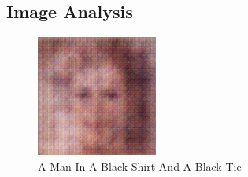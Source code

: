 \documentclass{article}%
\begin{document}
%
\subsection{Image Analysis}%
\label{subsec:ImageAnalysis}%


\begin{figure}[h!]%
\centering%
\includegraphics[width=150px]{500_fake_images/samples_5_147.png}%
\caption{A Man In A Black Shirt And A Black Tie}%
\end{figure}

%
\end{document}
